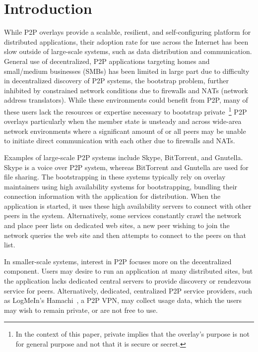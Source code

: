 \documentclass[conference]{IEEEtran}
\begin{document}
\section{Introduction}

While P2P overlays provide a scalable, resilient, and self-configuring platform
for distributed applications, their adoption rate for use across the Internet
has been slow outside of large-scale systems, such as data distribution and
communication.  General use of decentralized, P2P applications targeting homes
and small/medium businesses (SMBs) has been limited in large part due to
difficulty in decentralized discovery of P2P systems, the bootstrap problem,
further inhibited by constrained network conditions due to firewalls and NATs
(network address translators).  While these environments could benefit from
P2P, many of these users lack the resources or expertise necessary to bootstrap
private~\footnote{In the context of this paper, private implies that the
overlay's purpose is not for general purpose and not that it is secure or
secret.}  P2P overlays particularly when the member state is unsteady and
across wide-area network environments where a significant amount of or all
peers may be unable to initiate direct communication with each other due to
firewalls and NATs.

Examples of large-scale P2P systems include Skype, BitTorrent, and Gnutella.
Skype is a voice over P2P system, whereas BitTorrent and Gnutella are used for
file sharing.  The bootstrapping in these systems typically rely on overlay
maintainers using high availability systems for bootstrapping, bundling their
connection information with the application for distribution.  When the
application is started, it uses these high availability servers to connect with
other peers in the system.  Alternatively, some services constantly crawl the
network and place peer lists on dedicated web sites, a new peer wishing to join
the network queries the web site and then attempts to connect to the peers on
that list.

In smaller-scale systems, interest in P2P focuses more on the decentralized
component.  Users may desire to run an application at many distributed sites,
but the application lacks dedicated central servers to provide discovery or
rendezvous service for peers.  Alternatively, dedicated, centralized P2P
service providers, such as LogMeIn's Hamachi~\cite{hamachi}, a P2P VPN, may
collect usage data, which the users may wish to remain private, or are not free
to use.  
\end{document}
